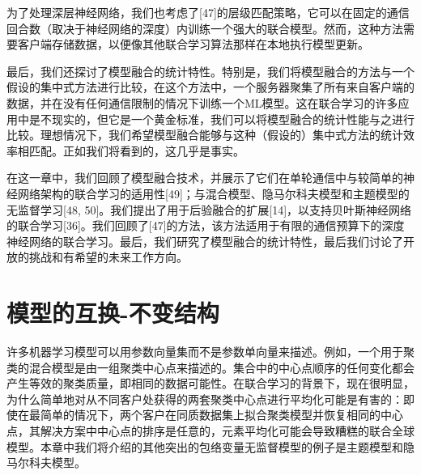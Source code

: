 为了处理深层神经网络，我们也考虑了[47]的层级匹配策略，它可以在固定的通信回合数（取决于神经网络的深度）内训练一个强大的联合模型。然而，这种方法需要客户端存储数据，以便像其他联合学习算法那样在本地执行模型更新。

最后，我们还探讨了模型融合的统计特性。特别是，我们将模型融合的方法与一个假设的集中式方法进行比较，在这个方法中，一个服务器聚集了所有来自客户端的数据，并在没有任何通信限制的情况下训练一个ML模型。这在联合学习的许多应用中是不现实的，但它是一个黄金标准，我们可以将模型融合的统计性能与之进行比较。理想情况下，我们希望模型融合能够与这种（假设的）集中式方法的统计效率相匹配。正如我们将看到的，这几乎是事实。

在这一章中，我们回顾了模型融合技术，并展示了它们在单轮通信中与较简单的神经网络架构的联合学习的适用性[49]；与混合模型、隐马尔科夫模型和主题模型的无监督学习[48, 50]。我们提出了用于后验融合的扩展[14]，以支持贝叶斯神经网络的联合学习[36]。我们回顾了[47]的方法，该方法适用于有限的通信预算下的深度神经网络的联合学习。最后，我们研究了模型融合的统计特性，最后我们讨论了开放的挑战和有希望的未来工作方向。

\section{模型的互换-不变结构}
许多机器学习模型可以用参数向量集而不是参数单向量来描述。例如，一个用于聚类的混合模型是由一组聚类中心点来描述的。集合中的中心点顺序的任何变化都会产生等效的聚类质量，即相同的数据可能性。在联合学习的背景下，现在很明显，为什么简单地对从不同客户处获得的两套聚类中心点进行平均化可能是有害的：即使在最简单的情况下，两个客户在同质数据集上拟合聚类模型并恢复相同的中心点，其解决方案中中心点的排序是任意的，元素平均化可能会导致糟糕的联合全球模型。本章中我们将介绍的其他突出的包络变量无监督模型的例子是主题模型和隐马尔科夫模型。

